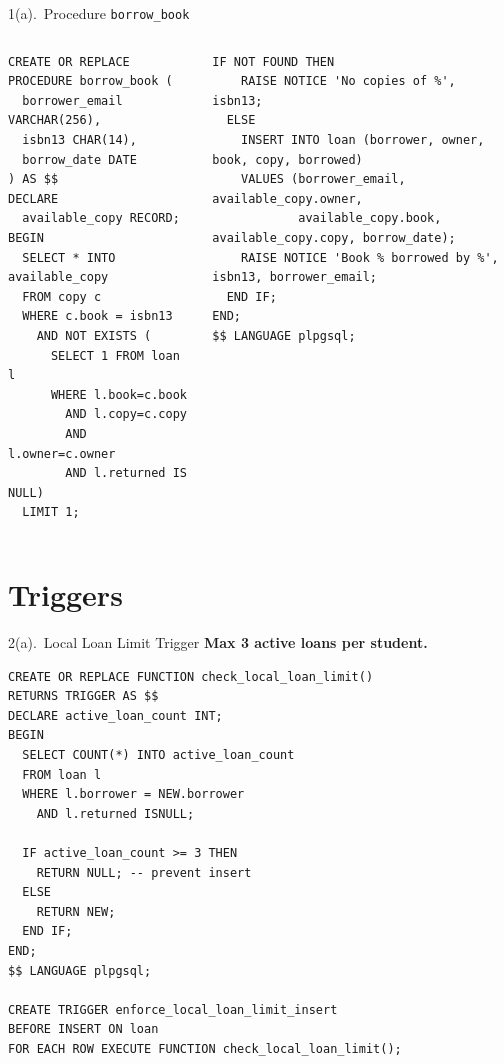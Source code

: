 \documentclass{beamer}
\begin{document}
\begin{frame}[fragile]{1(a).\ Procedure \texttt{borrow\_book}}
\vspace{-0.3em}
\begin{columns}[t,onlytextwidth]
\begin{lstlisting}[numbers=none]
CREATE OR REPLACE PROCEDURE borrow_book (
  borrower_email VARCHAR(256),
  isbn13 CHAR(14),
  borrow_date DATE
) AS $$
DECLARE
  available_copy RECORD;
BEGIN
  SELECT * INTO available_copy
  FROM copy c
  WHERE c.book = isbn13
    AND NOT EXISTS (
      SELECT 1 FROM loan l
      WHERE l.book=c.book
        AND l.copy=c.copy
        AND l.owner=c.owner
        AND l.returned IS NULL)
  LIMIT 1;
\end{lstlisting}

\begin{lstlisting}[numbers=none]
  IF NOT FOUND THEN
    RAISE NOTICE 'No copies of %', isbn13;
  ELSE
    INSERT INTO loan (borrower, owner, book, copy, borrowed)
    VALUES (borrower_email, available_copy.owner,
            available_copy.book, available_copy.copy, borrow_date);
    RAISE NOTICE 'Book % borrowed by %', isbn13, borrower_email;
  END IF;
END;
$$ LANGUAGE plpgsql;
\end{lstlisting}
\end{columns}
\end{frame}

\section{Triggers}
\begin{frame}[fragile]{2(a).\ Local Loan Limit Trigger}
\textbf{Max 3 active loans per student.}
\begin{lstlisting}
CREATE OR REPLACE FUNCTION check_local_loan_limit()
RETURNS TRIGGER AS $$
DECLARE active_loan_count INT;
BEGIN
  SELECT COUNT(*) INTO active_loan_count
  FROM loan l
  WHERE l.borrower = NEW.borrower
    AND l.returned ISNULL;

  IF active_loan_count >= 3 THEN
    RETURN NULL; -- prevent insert
  ELSE
    RETURN NEW;
  END IF;
END;
$$ LANGUAGE plpgsql;

CREATE TRIGGER enforce_local_loan_limit_insert
BEFORE INSERT ON loan
FOR EACH ROW EXECUTE FUNCTION check_local_loan_limit();
\end{lstlisting}
\end{frame}
\end{document}

